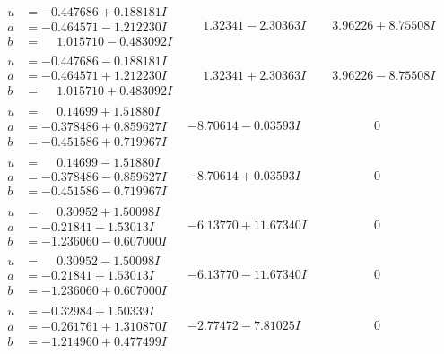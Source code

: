 \documentclass[1p]{elsarticle_modified}
\theoremstyle{definition}
\begin{document}
$$\begin{array}{c|c|c}
\begin{aligned}
u &= -0.447686 + 0.188181 I \\
a &= -0.464571 - 1.212230 I \\
b &= \phantom{-}1.015710 - 0.483092 I\end{aligned}
 & \phantom{-}1.32341 - 2.30363 I & \phantom{-}3.96226 + 8.75508 I \\ \hline\begin{aligned}
u &= -0.447686 - 0.188181 I \\
a &= -0.464571 + 1.212230 I \\
b &= \phantom{-}1.015710 + 0.483092 I\end{aligned}
 & \phantom{-}1.32341 + 2.30363 I & \phantom{-}3.96226 - 8.75508 I \\ \hline\begin{aligned}
u &= \phantom{-}0.14699 + 1.51880 I \\
a &= -0.378486 + 0.859627 I \\
b &= -0.451586 + 0.719967 I\end{aligned}
 & -8.70614 - 0.03593 I & \phantom{-0.000000 } 0 \\ \hline\begin{aligned}
u &= \phantom{-}0.14699 - 1.51880 I \\
a &= -0.378486 - 0.859627 I \\
b &= -0.451586 - 0.719967 I\end{aligned}
 & -8.70614 + 0.03593 I & \phantom{-0.000000 } 0 \\ \hline\begin{aligned}
u &= \phantom{-}0.30952 + 1.50098 I \\
a &= -0.21841 - 1.53013 I \\
b &= -1.236060 - 0.607000 I\end{aligned}
 & -6.13770 + 11.67340 I & \phantom{-0.000000 } 0 \\ \hline\begin{aligned}
u &= \phantom{-}0.30952 - 1.50098 I \\
a &= -0.21841 + 1.53013 I \\
b &= -1.236060 + 0.607000 I\end{aligned}
 & -6.13770 - 11.67340 I & \phantom{-0.000000 } 0 \\ \hline\begin{aligned}
u &= -0.32984 + 1.50339 I \\
a &= -0.261761 + 1.310870 I \\
b &= -1.214960 + 0.477499 I\end{aligned}
 & -2.77472 - 7.81025 I & \phantom{-0.000000 } 0 \\ \hline\begin{aligned}

\end{aligned}
\end{array}$$
\end{document}
